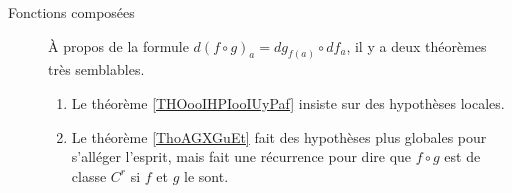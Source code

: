 \begin{description}
\begin{enumerate}
	      \end{enumerate}
	\item[Fonctions composées]
	      À propos de la formule \( d(f\circ g)_a=dg_{f(a)}\circ df_a\), il y a deux théorèmes très semblables.
	      \begin{enumerate}
		      \item
		            Le théorème \ref{THOooIHPIooIUyPaf} insiste sur des hypothèses locales.
		      \item
		            Le théorème \ref{ThoAGXGuEt} fait des hypothèses plus globales pour s'alléger l'esprit, mais fait une récurrence pour dire que \( f\circ g\) est de classe \( C^r\) si \( f\) et \( g\) le sont.
	      \end{enumerate}
\end{description}
